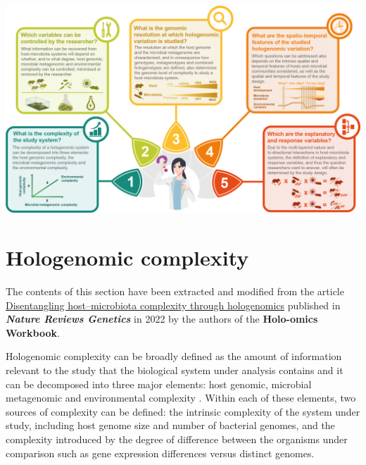 \documentclass[
]{book}
\begin{document}
\includegraphics{images/holo-omics_five_questions.png}

\hypertarget{hologenomic-complexity}{%
\section{Hologenomic complexity}\label{hologenomic-complexity}}

The contents of this section have been extracted and modified from the article \href{https://www.nature.com/articles/s41576-021-00421-0}{Disentangling host--microbiota complexity through hologenomics} published in \textbf{\emph{Nature Reviews Genetics}} in 2022 by the authors of the \textbf{Holo-omics Workbook}.

Hologenomic complexity can be broadly defined as the amount of information relevant to the study that the biological system under analysis contains and it can be decomposed into three major elements: host genomic, microbial metagenomic and environmental complexity \citep{Alberdi2022-ay}. Within each of these elements, two sources of complexity can be defined: the intrinsic complexity of the system under study, including host genome size and number of bacterial genomes, and the complexity introduced by the degree of difference between the organisms under comparison such as gene expression differences versus distinct genomes.
\end{document}
